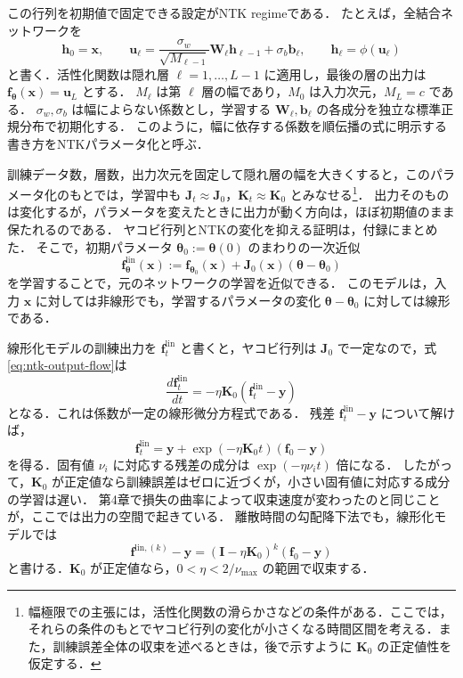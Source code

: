 \documentclass[../main.tex]{subfiles}
\begin{document}
この行列を初期値で固定できる設定がNTK regimeである．
たとえば，全結合ネットワークを
\begin{equation}
  \bm{h}_0=\bm{x},\qquad
  \bm{u}_\ell=\frac{\sigma_w}{\sqrt{M_{\ell-1}}}
    \bm{W}_\ell\bm{h}_{\ell-1}+\sigma_b\bm{b}_\ell,
  \qquad
  \bm{h}_\ell=\phi(\bm{u}_\ell)
  \label{eq:ntk-parameterization}
\end{equation}
と書く．活性化関数は隠れ層 $\ell=1,\ldots,L-1$ に適用し，最後の層の出力は $\bm{f}_{\bm{\theta}}(\bm{x})=\bm{u}_L$ とする．
$M_\ell$ は第 $\ell$ 層の幅であり，$M_0$ は入力次元，$M_L=c$ である．
$\sigma_w,\sigma_b$ は幅によらない係数とし，学習する $\bm{W}_\ell,\bm{b}_\ell$ の各成分を独立な標準正規分布で初期化する．
このように，幅に依存する係数を順伝播の式に明示する書き方をNTKパラメータ化と呼ぶ．

訓練データ数，層数，出力次元を固定して隠れ層の幅を大きくすると，このパラメータ化のもとでは，学習中も $\bm{J}_t\approx\bm{J}_0$，$\bm{K}_t\approx\bm{K}_0$ とみなせる\cite{jacot2018ntk,lee2019wide}\footnote{幅極限での主張には，活性化関数の滑らかさなどの条件がある．ここでは，それらの条件のもとでヤコビ行列の変化が小さくなる時間区間を考える．また，訓練誤差全体の収束を述べるときは，後で示すように $\bm{K}_0$ の正定値性を仮定する．}．
出力そのものは変化するが，パラメータを変えたときに出力が動く方向は，ほぼ初期値のまま保たれるのである．
ヤコビ行列とNTKの変化を抑える証明は，付録にまとめた．
そこで，初期パラメータ $\bm{\theta}_0:=\bm{\theta}(0)$ のまわりの一次近似
\begin{equation}
  \bm{f}^{\mathrm{lin}}_{\bm{\theta}}(\bm{x})
  :=\bm{f}_{\bm{\theta}_0}(\bm{x})
  +\bm{J}_0(\bm{x})(\bm{\theta}-\bm{\theta}_0)
  \label{eq:ntk-linearized-model}
\end{equation}
を学習することで，元のネットワークの学習を近似できる．
このモデルは，入力 $\bm{x}$ に対しては非線形でも，学習するパラメータの変化 $\bm{\theta}-\bm{\theta}_0$ に対しては線形である．

線形化モデルの訓練出力を $\bm{f}^{\mathrm{lin}}_t$ と書くと，ヤコビ行列は $\bm{J}_0$ で一定なので，式\eqref{eq:ntk-output-flow}は
\begin{equation}
  \frac{d\bm{f}^{\mathrm{lin}}_t}{dt}
  =-\eta\bm{K}_0(\bm{f}^{\mathrm{lin}}_t-\bm{y})
  \label{eq:ntk-linear-output-flow}
\end{equation}
となる．これは係数が一定の線形微分方程式である．
残差 $\bm{f}^{\mathrm{lin}}_t-\bm{y}$ について解けば，
\begin{equation}
  \bm{f}^{\mathrm{lin}}_t
  =\bm{y}+\exp(-\eta\bm{K}_0t)(\bm{f}_0-\bm{y})
  \label{eq:ntk-linear-solution}
\end{equation}
を得る．固有値 $\nu_i$ に対応する残差の成分は $\exp(-\eta\nu_i t)$ 倍になる．
したがって，$\bm{K}_0$ が正定値なら訓練誤差はゼロに近づくが，小さい固有値に対応する成分の学習は遅い．
第4章で損失の曲率によって収束速度が変わったのと同じことが，ここでは出力の空間で起きている．
離散時間の勾配降下法でも，線形化モデルでは
\begin{equation}
  \bm{f}^{\mathrm{lin},(k)}-\bm{y}
  =(\bm{I}-\eta\bm{K}_0)^k(\bm{f}_0-\bm{y})
  \label{eq:ntk-discrete-solution}
\end{equation}
と書ける．$\bm{K}_0$ が正定値なら，$0<\eta<2/\nu_{\max}$ の範囲で収束する．
\end{document}
